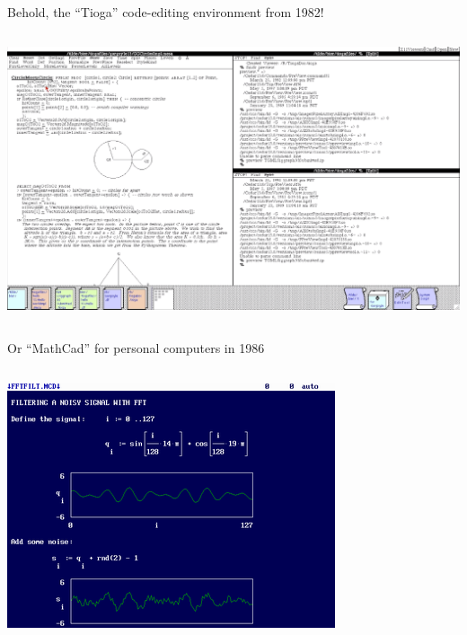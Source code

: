 \documentclass[aspectratio=169]{beamer}
\begin{document}
\begin{frame}{Behold, the ``Tioga'' code-editing environment from 1982!}
\vspace{0.2 cm}
\begin{columns}
\includegraphics[width=\linewidth]{img/screenshot-1982-cedar-tioga.png}
\end{columns}
\end{frame}

\begin{frame}{Or ``MathCad'' for personal computers in 1986}
\vspace{0.2 cm}
\begin{columns}
\includegraphics[width=\linewidth]{img/screenshot-1986-mathcad.png}
\end{columns}
\end{frame}
\end{document}
